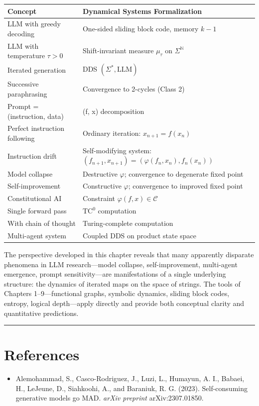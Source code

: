 \begin{tabular}{|l|l|}
\hline
Concept & Dynamical Systems Formalization \\
\hline
LLM with greedy decoding & One-sided sliding block code, memory $k-1$ \\
LLM with temperature $\tau > 0$ & Shift-invariant measure $\mu_\tau$ on $\Sigma^{\mathbb{N}}$ \\
Iterated generation & DDS $(\Sigma^*, \mathrm{LLM})$ \\
Successive paraphrasing & Convergence to 2-cycles (Class 2) \\
Prompt = (instruction, data) & (f, x) decomposition \\
Perfect instruction following & Ordinary iteration: $x_{n+1} = f(x_n)$ \\
Instruction drift & Self-modifying system: $(f_{n+1}, x_{n+1}) = (\varphi(f_n, x_n), f_n(x_n))$ \\
Model collapse & Destructive $\varphi$; convergence to degenerate fixed point \\
Self-improvement & Constructive $\varphi$; convergence to improved fixed point \\
Constitutional AI & Constraint $\varphi(f, x) \in \mathcal{C}$ \\
Single forward pass & $\mathrm{TC}^0$ computation \\
With chain of thought & Turing-complete computation \\
Multi-agent system & Coupled DDS on product state space \\
\hline
\end{tabular}


The perspective developed in this chapter reveals that many apparently disparate phenomena in LLM research---model collapse, self-improvement, multi-agent emergence, prompt sensitivity---are manifestations of a single underlying structure: the dynamics of iterated maps on the space of strings. The tools of Chapters 1--9---functional graphs, symbolic dynamics, sliding block codes, entropy, logical depth---apply directly and provide both conceptual clarity and quantitative predictions.

\bigskip\hrule\bigskip

\section{References}

\begin{itemize}
  \item Alemohammad, S., Casco-Rodriguez, J., Luzi, L., Humayun, A. I., Babaei, H., LeJeune, D., Siahkoohi, A., and Baraniuk, R. G. (2023). Self-consuming generative models go MAD. \textit{arXiv preprint} arXiv:2307.01850.
\end{itemize}

